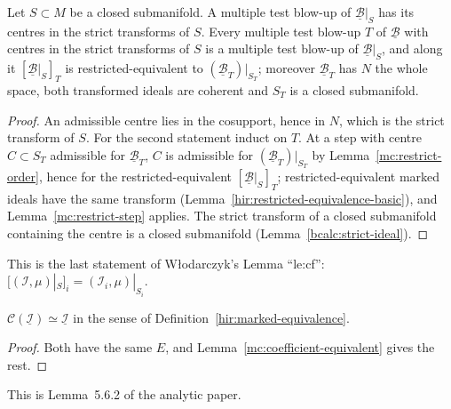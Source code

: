 \begin{lemma}
\label{mc:restrict-tower}
\leanok
Let \(S\subset M\) be a closed submanifold. A multiple test blow-up of \(\underline{\mathcal B}|_S\) has its centres in the strict transforms of \(S\).
Every multiple test blow-up \(T\) of \(\underline{\mathcal B}\) with centres in the strict transforms of \(S\) is a multiple test blow-up of
\(\underline{\mathcal B}|_S\), and along it \([\underline{\mathcal B}|_S]_T\) is restricted-equivalent to \((\underline{\mathcal B}_T)|_{S_T}\); moreover
\(\underline{\mathcal B}_T\) has \(N\) the whole space, both transformed ideals are coherent and \(S_T\) is a closed submanifold.
\end{lemma}
\begin{proof}
\leanok
An admissible centre lies in the cosupport, hence in \(N\), which is the strict transform of \(S\). For the second statement induct on \(T\). At a step
with centre \(C\subset S_T\) admissible for \(\underline{\mathcal B}_T\), \(C\) is admissible for \((\underline{\mathcal B}_T)|_{S_T}\) by
Lemma~\ref{mc:restrict-order}, hence for the restricted-equivalent \([\underline{\mathcal B}|_S]_T\); restricted-equivalent marked ideals have the same
transform (Lemma~\ref{hir:restricted-equivalence-basic}), and Lemma~\ref{mc:restrict-step} applies. The strict transform of a closed submanifold
containing the centre is a closed submanifold (Lemma~\ref{bcalc:strict-ideal}).
\end{proof}
This is the last statement of Włodarczyk's Lemma ``le:cf'': \([(\mathcal I,\mu)|_S]_i=(\mathcal I_i,\mu)|_{S_i}\).

\begin{lemma}
\label{mc:coefficient-wequiv}
\leanok
\(\mathcal C(\underline{\mathcal I})\simeq\underline{\mathcal I}\) in the sense of Definition~\ref{hir:marked-equivalence}.
\end{lemma}
\begin{proof}
\leanok
Both have the same \(E\), and Lemma~\ref{mc:coefficient-equivalent} gives the rest.
\end{proof}
This is Lemma~5.6.2 of the analytic paper.

